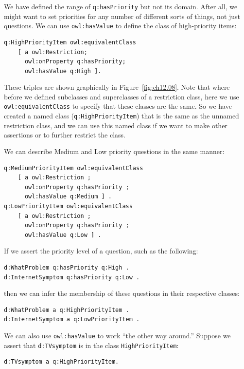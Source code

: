 We have defined the range of \texttt{q:hasPriority} but not its domain. After
all, we might want to set priorities for any number of different sorts
of things, not just questions. We can use \texttt{owl:hasValue} to define the
class of high-priority items:

\begin{lstlisting}
q:HighPriorityItem owl:equivalentClass
    [ a owl:Restriction;
      owl:onProperty q:hasPriority;
      owl:hasValue q:High ].
\end{lstlisting}

These triples are shown graphically in Figure~\ref{fig:ch12.08}. Note that where
before we defined subclasses and superclasses of a restriction class,
here we use \texttt{owl:equivalentClass} to specify that these classes are the
same. So we have created a named class (\texttt{q:HighPriorityItem}) that is the
same as the unnamed restriction class, and we can use this named class
if we want to make other assertions or to further restrict the class.

We can describe Medium and Low priority questions in the same manner:

\begin{lstlisting}
q:MediumPriorityItem owl:equivalentClass
    [ a owl:Restriction ;
      owl:onProperty q:hasPriority ;
      owl:hasValue q:Medium ] .
q:LowPriorityItem owl:equivalentClass 
    [ a owl:Restriction ;
      owl:onProperty q:hasPriority ;
      owl:hasValue q:Low ] .
\end{lstlisting}

If we assert the priority level of a question, such as the following:

\begin{lstlisting}
d:WhatProblem q:hasPriority q:High .
d:InternetSymptom q:hasPriority q:Low .
\end{lstlisting}

then we can infer the membership of these questions in their respective
classes:

\begin{lstlisting}
d:WhatProblem a q:HighPriorityItem .
d:InternetSymptom a q:LowPriorityItem .
\end{lstlisting}

We can also use \texttt{owl:hasValue} to work ``the other way around.'' Suppose
we assert that \texttt{d:TVsymptom} is in the class \texttt{HighPriorityItem}:


\begin{lstlisting}
d:TVsymptom a q:HighPriorityItem.
\end{lstlisting}

